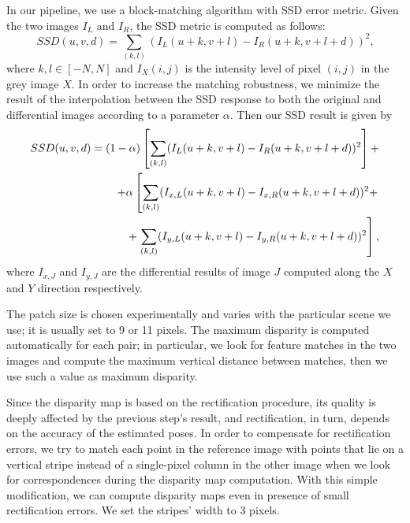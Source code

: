 In our pipeline, we use a block-matching algorithm with SSD error metric.
Given the two images $I_L$ and $I_R$, the SSD metric is computed as follows:
\begin{equation*}
SSD(u, v, d) = \sum_{(k, l)}(I_L(u + k, v + l) - I_R(u + k, v + l + d))^2	\textit{,}
\end{equation*}
\noindent where $k, l \in [-N, N]$ and $I_X(i, j)$ is the intensity level
of pixel $(i,j)$ in the grey image $X$.
In order to increase the matching robustness, we minimize the result of the
interpolation between the SSD response to both the original and differential 
images according to a parameter $\alpha$. 
Then our SSD result is given by
\begin{equation*}
\begin{split}
SSD(u, v, d) = (1 - \alpha) \left[ \sum_{(k, l)}(I_L(u + k, v + l) - I_R(u + k, v + l + d))^2\right] + \\
	 + \alpha\left[ \sum_{(k, l)}(I_{x,L}(u + k, v + l) - I_{x,R}(u + k, v + l + d))^2 + \right. \\
	 + \left. \sum_{(k, l)}(I_{y,L}(u + k, v + l) - I_{y,R}(u + k, v + l + d))^2 \vphantom{\sum_{(k, l)}} \right] \text{,}
\end{split}
\end{equation*}
%
\noindent where $I_{x, J}$ and $I_{y, J}$ are the differential results of image $J$
computed along the $X$ and $Y$ direction respectively.

The patch size is chosen experimentally and varies with the particular scene
we use; it is usually set to 9 or 11 pixels.
The maximum disparity is computed automatically for each pair; in particular,
we look for feature matches in the two images and compute the maximum vertical
distance between matches, then we use such a value as maximum disparity.

Since the disparity map is based on the rectification procedure, its quality
is deeply affected by the previous step's result, and rectification, in turn,
depends on the accuracy of the estimated poses. In order to compensate for
rectification errors, we try to match each point in the reference image with points that
lie on a vertical stripe instead of a single-pixel column in the other image
when we look for correspondences during the disparity map
computation. With this simple modification, we can compute disparity maps
even in presence of small rectification errors. We set the stripes' width to 3
pixels.

